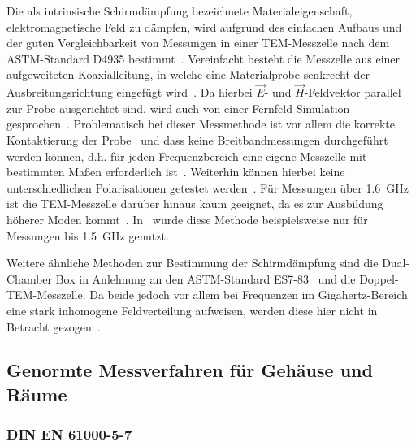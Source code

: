 Die als intrinsische Schirmdämpfung bezeichnete Materialeigenschaft, elektromagnetische Feld zu dämpfen, wird aufgrund des einfachen Aufbaus und der guten Vergleichbarkeit von Messungen in einer TEM-Messzelle nach dem ASTM-Standard D4935 bestimmt~\cite{ASTM_D4935, Measurement_Shielding_Textile_Materials_Free_Space_Transmission}. Vereinfacht besteht die Messzelle aus einer aufgeweiteten Koaxialleitung, in welche eine Materialprobe senkrecht der Ausbreitungsrichtung eingefügt wird~\cite{EM_Schirmung, Handbook_EMI_Vol_3}. Da hierbei $\vec E$- und $\vec H$-Feldvektor parallel zur Probe ausgerichtet sind, wird auch von einer Fernfeld-Simulation gesprochen~\cite{Techniques_Shielding_Effectiveness_Far_Field_Simulation, EMV}. Problematisch bei dieser Messmethode ist vor allem die korrekte Kontaktierung der Probe~\cite{EM_Schirmung} und dass keine Breitbandmessungen durchgeführt werden können, d.h. für jeden Frequenzbereich eine eigene Messzelle mit bestimmten Maßen erforderlich ist~\cite{Techniques_Shielding_Effectiveness_Far_Field_Simulation, EMV}. Weiterhin können hierbei keine unterschiedlichen Polarisationen getestet werden~\cite{Techniques_Shielding_Effectiveness_Far_Field_Simulation}. Für Messungen über \SI{1,6}{\giga\hertz} ist die TEM-Messzelle darüber hinaus kaum geeignet, da es zur Ausbildung höherer Moden kommt~\cite{EMV}. In~\cite{Measurement_Electromagnetic_Shielding_Effectiveness_Composite_Carbon_Nickel_Thinfilm} wurde diese Methode beispielsweise nur für Messungen bis \SI{1,5}{\giga\hertz} genutzt.
\par
\vspace{\linespace}
Weitere ähnliche Methoden zur Bestimmung der Schirmdämpfung sind die Dual-Chamber Box in Anlehnung an den ASTM-Standard ES7-83~\cite{ASTM_ES7-83} und die Doppel-TEM-Messzelle. Da beide jedoch vor allem bei Frequenzen im Gigahertz-Bereich eine stark inhomogene Feldverteilung aufweisen, werden diese hier nicht in Betracht gezogen~\cite{EM_Schirmung, EMV}.


\subsection{Genormte Messverfahren für Gehäuse und Räume}\label{cha:2_sub_Genormte_Messverfahren}

\subsubsection{DIN EN 61000-5-7}

